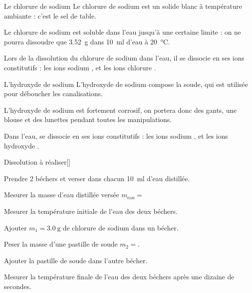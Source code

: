 \begin{multicols}{2}
  \begin{doc}{Le chlorure de sodium}
    Le chlorure de sodium  est un solide blanc à température ambiante : c'est le sel de table.
    \vspace*{4pt}
    
    Le chlorure de sodium est soluble dans l'eau jusqu'à une certaine limite : on ne pourra dissoudre que \qty{3,52}{\g} dans \qty{10}{\ml} d'eau à \qty{20}{\degreeCelsius}.
    \vspace*{5pt}
  
    Lors de la dissolution du chlorure de sodium dans l'eau, il se dissocie en ses ions constitutifs : les ions sodium \ionSodium, et les ions chlorure \chlorure.
  \end{doc}
  
  \begin{doc}{L'hydroxyde de sodium}
    L'hydroxyde de sodium  compose la soude, qui est utilisée pour déboucher les canalisations.
    \vspace*{-4pt}

    \begin{importants}  
      \attention L'hydroxyde de sodium est fortement corrosif, on portera donc des gants, une blouse et des lunettes pendant toutes les manipulations.
    \end{importants}
    \vspace*{-4pt}
  
    Dans l'eau,  se dissocie en ses ions constitutifs : les ions sodium \ionSodium, et les ions hydroxyde .
  \end{doc}
\end{multicols}

\begin{doc}{Dissolution à réaliser}[\label{doc:dissolution_protocole}]
  \begin{protocole}
      
    \item Prendre 2 béchers et verser dans chacun \qty{10}{\ml} d’eau distillée.
    \item Mesurer la masse d'eau distillée versée $m_\text{eau} =$
    \item Mesurer la température initiale de l'eau des deux béchers.
    \item Ajouter $m_1 = \qty{3,0}{\g}$ de chlorure de sodium dans un bécher.
    \item Peser la masse d'une pastille de soude $m_2 =$.
    \item Ajouter la pastille de soude dans l'autre bécher.
    \item Mesurer la température finale de l'eau des deux béchers après une dizaine de secondes.
  \end{protocole}
\end{doc}


